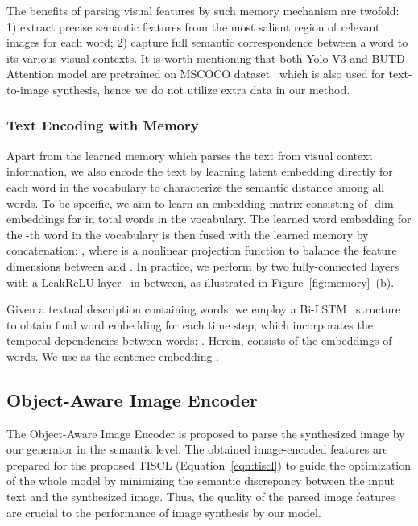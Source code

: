 \documentclass[runningheads]{llncs}
\begin{document}
\noindent The benefits of parsing visual features by such memory mechanism are twofold: 1) extract precise semantic features from the most salient region of relevant images for each word; 2) capture full semantic correspondence between a word to its various visual contexts. 
It is worth mentioning that both Yolo-V3 and BUTD Attention model are pretrained on MSCOCO dataset~\cite{lin2014microsoft} which is also used for text-to-image synthesis, hence we do not utilize extra data in our method. 

\subsubsection{Text Encoding with Memory}
Apart from the learned memory which parses the text from visual context information, we also encode the text by learning latent embedding directly for each word in the vocabulary to characterize the semantic distance among all words. To be specific, we aim to learn an embedding matrix  consisting of -dim embeddings for in total  words in the vocabulary. The learned word embedding  for the -th word in the vocabulary is then fused with the learned memory  by concatenation: ,
where  is a nonlinear projection function to balance the feature dimensions between  and . In practice, we perform  by two fully-connected layers with a LeakReLU layer~\cite{xu2015empirical} in between, as illustrated in Figure~\ref{fig:memory}\ (b).

\noindent Given a textual description  containing  words, we employ a Bi-LSTM~\cite{huang2015bidirectional} structure to obtain final word embedding for each time step, which incorporates the temporal dependencies between words: .
\noindent
Herein,  consists of the embeddings of  words. We use  as the sentence embedding .

\subsection{Object-Aware Image Encoder}
\label{sec:image_enc}
The Object-Aware Image Encoder is proposed to parse the synthesized image by our generator in the semantic level. The obtained image-encoded features are prepared for the proposed TISCL (Equation~\ref{eqn:tiscl}) to guide the optimization of the whole model by minimizing the semantic discrepancy between the input text and the synthesized image. Thus, the quality of the parsed image features are crucial to the performance of image synthesis by our model.
\end{document}
